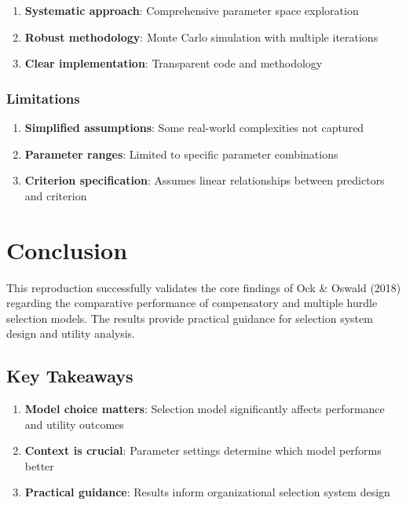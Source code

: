 \documentclass[
]{article}
\providecommand{\tightlist}{%
  \setlength{\itemsep}{0pt}\setlength{\parskip}{0pt}}
\begin{document}
\begin{enumerate}
\def\labelenumi{\arabic{enumi}.}
\tightlist
\item
  \textbf{Systematic approach}: Comprehensive parameter space
  exploration
\item
  \textbf{Robust methodology}: Monte Carlo simulation with multiple
  iterations
\item
  \textbf{Clear implementation}: Transparent code and methodology
\end{enumerate}

\subsubsection{Limitations}\label{limitations}

\begin{enumerate}
\def\labelenumi{\arabic{enumi}.}
\tightlist
\item
  \textbf{Simplified assumptions}: Some real-world complexities not
  captured
\item
  \textbf{Parameter ranges}: Limited to specific parameter combinations
\item
  \textbf{Criterion specification}: Assumes linear relationships between
  predictors and criterion
\end{enumerate}

\section{Conclusion}\label{conclusion}

This reproduction successfully validates the core findings of Ock \&
Oswald (2018) regarding the comparative performance of compensatory and
multiple hurdle selection models. The results provide practical guidance
for selection system design and utility analysis.

\subsection{Key Takeaways}\label{key-takeaways}

\begin{enumerate}
\def\labelenumi{\arabic{enumi}.}
\tightlist
\item
  \textbf{Model choice matters}: Selection model significantly affects
  performance and utility outcomes
\item
  \textbf{Context is crucial}: Parameter settings determine which model
  performs better
\item
  \textbf{Practical guidance}: Results inform organizational selection
  system design
\end{enumerate}
\end{document}
